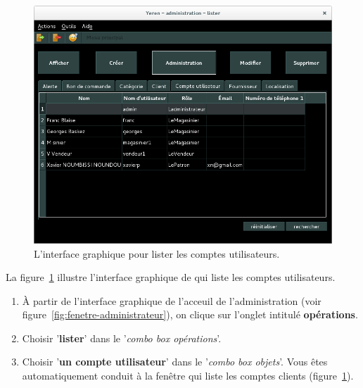 \begin{figure}[!htpb]
	\centering
	\includegraphics[scale=0.45]{images/compte-utilisateur-lister.png}
	\caption{L'interface graphique pour lister les comptes utilisateurs.}
	\label{fig:admin-comptes-utilisateurs-lister}
\end{figure}

La figure~\ref{fig:admin-comptes-utilisateurs-lister}
illustre l'interface graphique de \yeren qui liste les
comptes utilisateurs.

\begin{enumerate}[1)]
	\item \`A partir de l'interface graphique de l'acceuil de
		l'administration (voir figure~\ref{fig:fenetre-administrateur}),
		on clique sur l'onglet intitul\'e \textbf{op\'erations}. 
		
	\item Choisir '\textbf{lister}' dans le '\emph{combo box
		op\'erations}'.
		
	\item Choisir '\textbf{un compte utilisateur}' dans
		le '\emph{combo box objets}'. Vous \^etes automatiquement
		conduit \`a la fen\^etre qui liste les comptes clients
		(figure~\ref{fig:admin-comptes-utilisateurs-lister}).
\end{enumerate}


\newpage
{}


